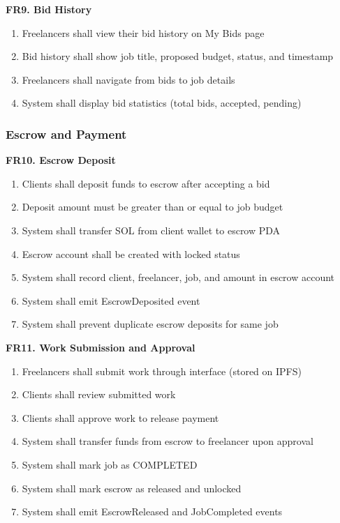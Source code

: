 \documentclass[a4paper,13pt,twoside]{report}
\theoremstyle{definition}
\begin{document}
\textbf{FR9. Bid History}

\begin{enumerate}
    \item Freelancers shall view their bid history on My Bids page
    \item Bid history shall show job title, proposed budget, status, and timestamp
    \item Freelancers shall navigate from bids to job details
    \item System shall display bid statistics (total bids, accepted, pending)
\end{enumerate}

\subsubsection{Escrow and Payment}

\textbf{FR10. Escrow Deposit}

\begin{enumerate}
    \item Clients shall deposit funds to escrow after accepting a bid
    \item Deposit amount must be greater than or equal to job budget
    \item System shall transfer SOL from client wallet to escrow PDA
    \item Escrow account shall be created with locked status
    \item System shall record client, freelancer, job, and amount in escrow account
    \item System shall emit EscrowDeposited event
    \item System shall prevent duplicate escrow deposits for same job
\end{enumerate}

\textbf{FR11. Work Submission and Approval}

\begin{enumerate}
    \item Freelancers shall submit work through interface (stored on IPFS)
    \item Clients shall review submitted work
    \item Clients shall approve work to release payment
    \item System shall transfer funds from escrow to freelancer upon approval
    \item System shall mark job as COMPLETED
    \item System shall mark escrow as released and unlocked
    \item System shall emit EscrowReleased and JobCompleted events
\end{enumerate}
\end{document}

